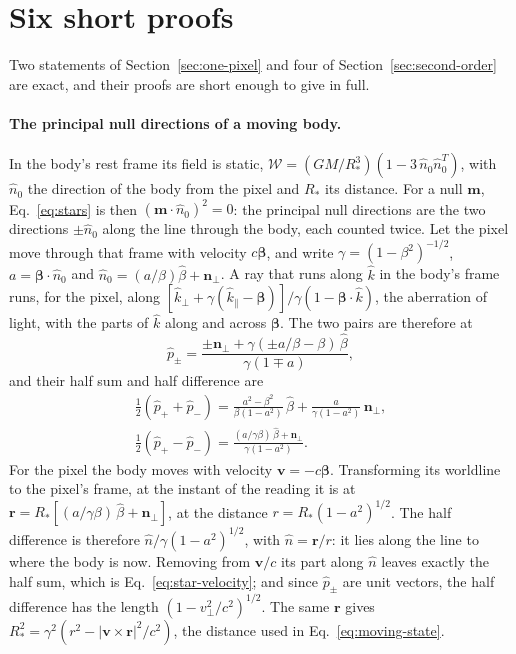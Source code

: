 \section{Six short proofs}\label{app:proofs}

Two statements of Section~\ref{sec:one-pixel} and four of
Section~\ref{sec:second-order} are exact, and their proofs are short enough to give in
full.

\paragraph{The principal null directions of a moving body.} In the body's rest frame its field is
static, $\mathcal W = (GM/R_*^3)(1 - 3\,\hat n_0\hat n_0^{T})$, with $\hat n_0$
the direction of the body from the pixel and $R_*$ its distance. For a null
$\mathbf m$, Eq.~\eqref{eq:stars} is then $(\mathbf m\cdot\hat n_0)^2 = 0$: the
principal null directions are the two directions $\pm\hat n_0$ along the line through the body, each
counted twice. Let the pixel move through that frame with velocity
$c\boldsymbol\beta$, and write $\gamma = (1 - \beta^2)^{-1/2}$,
$a = \boldsymbol\beta\cdot\hat n_0$ and
$\hat n_0 = (a/\beta)\hat\beta + \mathbf n_\perp$. A ray that runs along $\hat k$
in the body's frame runs, for the pixel, along
$[\hat k_\perp + \gamma(\hat k_\parallel - \boldsymbol\beta)]/\gamma(1 -
\boldsymbol\beta\cdot\hat k)$, the aberration of light, with the parts of
$\hat k$ along and across $\boldsymbol\beta$. The two pairs are
therefore at
\begin{equation}\label{eq:proof-stars}
\hat p_\pm = \frac{\pm\mathbf n_\perp + \gamma(\pm a/\beta - \beta)\,\hat\beta}{\gamma(1 \mp a)} ,
\end{equation}
and their half sum and half difference are
\begin{equation}\label{eq:proof-midpoint}
\begin{gathered}
\tfrac12(\hat p_+ + \hat p_-) = \frac{a^2 - \beta^2}{\beta(1 - a^2)}\,\hat\beta
+ \frac{a}{\gamma(1 - a^2)}\,\mathbf n_\perp ,\\
\tfrac12(\hat p_+ - \hat p_-) = \frac{(a/\gamma\beta)\,\hat\beta + \mathbf n_\perp}{\gamma(1 - a^2)} .
\end{gathered}
\end{equation}
For the pixel the body moves with velocity $\mathbf v = -c\boldsymbol\beta$.
Transforming its worldline to the pixel's frame, at the instant of the reading
it is at $\mathbf r = R_*[(a/\gamma\beta)\,\hat\beta + \mathbf n_\perp]$, at the
distance $r = R_*(1 - a^2)^{1/2}$. The half difference is therefore
$\hat n/\gamma(1 - a^2)^{1/2}$, with $\hat n = \mathbf r/r$: it lies along the
line to where the body is now. Removing from $\mathbf v/c$ its part along
$\hat n$ leaves exactly the half sum, which is Eq.~\eqref{eq:star-velocity}; and
since $\hat p_\pm$ are unit vectors, the half difference has the length
$(1 - v_\perp^2/c^2)^{1/2}$. The same $\mathbf r$ gives
$R_*^2 = \gamma^2(r^2 - |\mathbf v\times\mathbf r|^2/c^2)$, the distance used in
Eq.~\eqref{eq:moving-state}.

